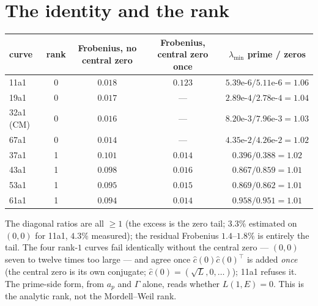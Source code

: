 \documentclass[11pt]{article}
\begin{document}
\section{The identity and the rank}
\begin{center}\small
\begin{tabular}{lcccc}\toprule
curve & rank & Frobenius, no central zero & Frobenius, central zero once & $\lambda_{\min}$ prime / zeros\\\midrule
11a1 & 0 & $\mathbf{0.018}$ & $0.123$ & $5.39\text{e-}6/5.11\text{e-}6=1.06$\\
19a1 & 0 & $\mathbf{0.017}$ & --- & $2.89\text{e-}4/2.78\text{e-}4=1.04$\\
32a1 (CM) & 0 & $\mathbf{0.016}$ & --- & $8.20\text{e-}3/7.96\text{e-}3=1.03$\\
67a1 & 0 & $\mathbf{0.014}$ & --- & $4.35\text{e-}2/4.26\text{e-}2=1.02$\\
37a1 & 1 & $0.101$ & $\mathbf{0.014}$ & $0.396/0.388=1.02$\\
43a1 & 1 & $0.098$ & $\mathbf{0.016}$ & $0.867/0.859=1.01$\\
53a1 & 1 & $0.095$ & $\mathbf{0.015}$ & $0.869/0.862=1.01$\\
61a1 & 1 & $0.094$ & $\mathbf{0.014}$ & $0.958/0.951=1.01$\\\bottomrule
\end{tabular}
\end{center}
The diagonal ratios are all $\ge1$ (the excess is the zero tail; $3.3\%$ estimated on $(0,0)$ for 11a1, $4.3\%$ measured); the residual Frobenius $1.4$--$1.8\%$ is entirely the tail. The four rank-$1$ curves fail identically without the central zero --- $(0,0)$ seven to twelve times too large --- and agree once $\hat c(0)\hat c(0)^{\!\top}$ is added \emph{once} (the central zero is its own conjugate; $\hat c(0)=(\sqrt L,0,\dots)$); 11a1 refuses it. The prime-side form, from $a_p$ and $\Gamma$ alone, reads whether $L(1,E)=0$. This is the analytic rank, not the Mordell--Weil rank.
\end{document}
